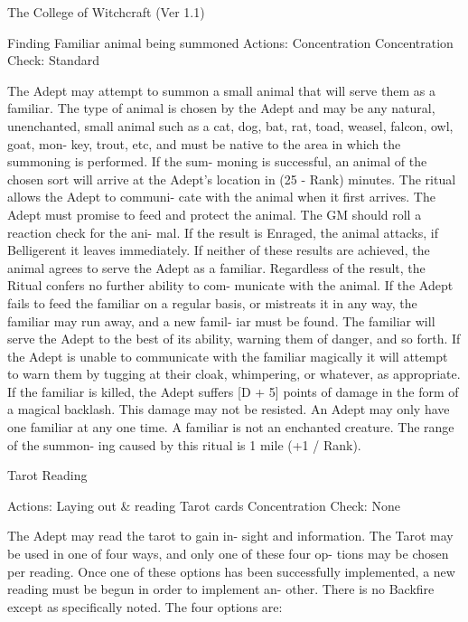 \begin{Chapter}{The College of Witchcraft (Ver 1.1)}
\begin{ritual}[Q-1]{Finding Familiar }
animal being summoned 
Actions: Concentration 
Concentration Check: Standard 
\begin{effects}
The Adept may attempt to summon a small 
animal that will serve them as a familiar. The type 
of  animal  is  chosen  by  the  Adept  and  may  be  any 
natural,  unenchanted,  small  animal  such  as  a  cat, 
dog, bat, rat, toad, weasel, falcon, owl, goat, mon-
key,  trout,  etc,  and  must  be  native  to  the  area  in 
which  the  summoning  is  performed.  If  the  sum-
moning is successful, an animal of the chosen sort 
will  arrive  at  the  Adept’s  location  in  (25  -  Rank) 
minutes.  The  ritual  allows  the  Adept  to  communi-
cate  with  the  animal  when  it  first  arrives.  The 
Adept must promise to feed and protect the animal. 
The  GM  should  roll  a  reaction  check  for  the  ani-
mal.  If the result is Enraged, the animal attacks, if 
Belligerent  it  leaves  immediately.  If  neither  of 
these  results  are  achieved,  the  animal  agrees  to 
serve  the  Adept  as  a  familiar.  Regardless  of  the 
result, the Ritual confers no further ability to com-
municate with the animal. If the Adept fails to feed 
the familiar on a regular basis, or mistreats it in any 
way, the familiar may run away, and a new famil-
iar  must  be  found.  The  familiar  will  serve  the 
Adept  to  the  best  of  its  ability,  warning  them  of 
danger,  and  so  forth.  If  the  Adept  is  unable  to 
communicate  with  the  familiar  magically  it  will 
attempt  to  warn  them  by  tugging  at  their  cloak, 
whimpering,  or  whatever,  as  appropriate.  If  the 
familiar is killed, the Adept suffers [D + 5] points 
of damage in the form of a magical backlash. This 
damage  may  not  be  resisted.  An  Adept  may  only 
have one familiar at any one time. A familiar is not 
an  enchanted  creature.  The  range  of  the  summon-
ing caused by this ritual is 1 mile (+1 / Rank). 

\end{effects}
\end{ritual}

\begin{ritual}[Q-2]{Tarot Reading }

Actions: Laying out \& reading Tarot cards 
Concentration Check: None 
\begin{effects}
 The  Adept  may  read  the  tarot  to  gain  in-
sight  and  information.  The  Tarot  may  be  used  in 
one  of  four  ways,  and  only  one  of  these  four  op-
tions may be chosen per reading. Once one of these 
options has  been  successfully  implemented, a new 
reading  must  be  begun  in  order  to  implement  an-
other.  There  is  no  Backfire  except  as  specifically 
noted. The four options are: 


\end{effects}
\end{ritual}
\end{Chapter}
